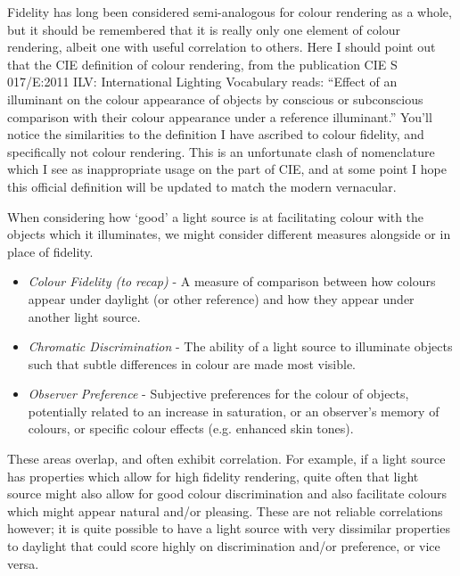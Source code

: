 Fidelity has long been considered semi-analogous for colour rendering as a whole, but it should be remembered that it is really only one element of colour rendering, albeit one with useful correlation to others. Here I should point out that the CIE definition of colour rendering, from the publication CIE S 017/E:2011 ILV: International Lighting Vocabulary \citep{cie_cie_2011} reads: ``Effect of an illuminant on the colour appearance of objects by conscious or subconscious comparison with their colour appearance under a reference illuminant.'' You'll notice the similarities to the definition I have ascribed to colour fidelity, and specifically not colour rendering. This is an unfortunate clash of nomenclature which I see as inappropriate usage on the part of CIE, and at some point I hope this official definition will be updated to match the modern vernacular.

When considering how `good' a light source is at facilitating colour with the objects which it illuminates, we might consider different measures alongside or in place of fidelity.

\begin{itemize}
\item \emph{Colour Fidelity (to recap)} - A measure of comparison between how colours appear under daylight (or other reference) and how they appear under another light source. %
\item \emph{Chromatic Discrimination} - The ability of a light source to illuminate objects such that subtle differences in colour are made most visible. %
\item \emph{Observer Preference} - Subjective preferences for the colour of objects, potentially related to an increase in saturation, or an observer's memory of colours, or specific colour effects (e.g. enhanced skin tones). %
\end{itemize}

These areas overlap, and often exhibit correlation. For example, if a light source has properties which allow for high fidelity rendering, quite often that light source might also allow for good colour discrimination and also facilitate colours which might appear natural and/or pleasing. These are not reliable correlations however; it is quite possible to have a light source with very dissimilar properties to daylight that could score highly on discrimination and/or preference, or vice versa.

